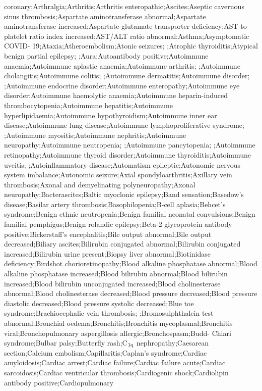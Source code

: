 \begin{refsection}
\begin{tcolorbox}[quote]
coronary;Arthralgia;Arthritis;Arthritis enteropathic;Ascites;Aseptic cavernous sinus thrombosis;Aspartate aminotransferase abnormal;Aspartate aminotransferase increased;Aspartate-glutamate-transporter deficiency;AST to platelet ratio index increased;AST/ALT ratio abnormal;Asthma;Asymptomatic COVID- 19;Ataxia;Atheroembolism;Atonic seizures; ;Atrophic thyroiditis;Atypical benign partial epilepsy; ;Aura;Autoantibody positive;Autoimmune anaemia;Autoimmune aplastic anaemia;Autoimmune arthritis; ;Autoimmune cholangitis;Autoimmune colitis; ;Autoimmune dermatitis;Autoimmune disorder; ;Autoimmune endocrine disorder;Autoimmune enteropathy;Autoimmune eye disorder;Autoimmune haemolytic anaemia;Autoimmune heparin-induced thrombocytopenia;Autoimmune hepatitis;Autoimmune hyperlipidaemia;Autoimmune hypothyroidism;Autoimmune inner ear disease;Autoimmune lung disease;Autoimmune lymphoproliferative syndrome; ;Autoimmune myositis;Autoimmune nephritis;Autoimmune neuropathy;Autoimmune neutropenia; ;Autoimmune pancytopenia; ;Autoimmune retinopathy;Autoimmune thyroid disorder;Autoimmune thyroiditis;Autoimmune uveitis; ;Autoinflammatory disease;Automatism epileptic;Autonomic nervous system imbalance;Autonomic seizure;Axial spondyloarthritis;Axillary vein thrombosis;Axonal and demyelinating polyneuropathy;Axonal neuropathy;Bacterascites;Baltic myoclonic epilepsy;Band sensation;Basedow's disease;Basilar artery thrombosis;Basophilopenia;B-cell aplasia;Behcet's syndrome;Benign ethnic neutropenia;Benign familial neonatal convulsions;Benign familial pemphigus;Benign rolandic epilepsy;Beta-2 glycoprotein antibody positive;Bickerstaff's encephalitis;Bile output abnormal;Bile output decreased;Biliary ascites;Bilirubin conjugated abnormal;Bilirubin conjugated increased;Bilirubin urine present;Biopsy liver abnormal;Biotinidase deficiency;Birdshot chorioretinopathy;Blood alkaline phosphatase abnormal;Blood alkaline phosphatase increased;Blood bilirubin abnormal;Blood bilirubin increased;Blood bilirubin unconjugated increased;Blood cholinesterase abnormal;Blood cholinesterase decreased;Blood pressure decreased;Blood pressure diastolic decreased;Blood pressure systolic decreased;Blue toe syndrome;Brachiocephalic vein thrombosis; ;Bromosulphthalein test abnormal;Bronchial oedema;Bronchitis;Bronchitis mycoplasmal;Bronchitis viral;Bronchopulmonary aspergillosis allergic;Bronchospasm;Budd- Chiari syndrome;Bulbar palsy;Butterfly rash;C$_{1\textnormal{q}}$ nephropathy;Caesarean section;Calcium embolism;Capillaritis;Caplan's syndrome;Cardiac amyloidosis;Cardiac arrest;Cardiac failure;Cardiac failure acute;Cardiac sarcoidosis;Cardiac ventricular thrombosis;Cardiogenic shock;Cardiolipin antibody positive;Cardiopulmonary 
\end{tcolorbox}
\end{refsection}
